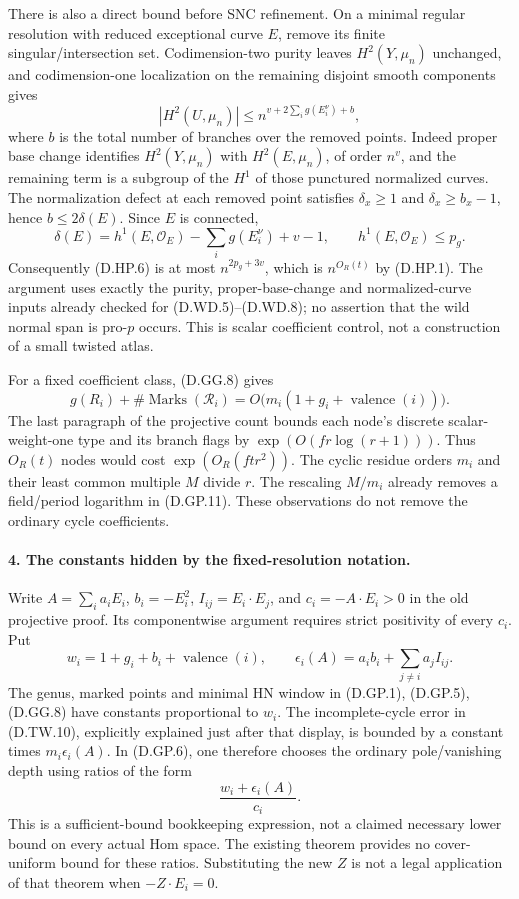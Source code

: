 There is also a direct bound before SNC refinement. On a minimal
regular resolution with reduced exceptional curve $E$, remove
its finite singular/intersection set. Codimension-two purity
leaves $H^2(Y,\mu_n)$ unchanged, and codimension-one localization
on the remaining disjoint smooth components gives
\[
 |H^2(U,\mu_n)|\le
 n^{v+2\sum_i g(E_i^\nu)+b},                             \tag{D.HP.6}
\]
where $b$ is the total number of branches over the removed
points. Indeed proper base change identifies $H^2(Y,\mu_n)$
with $H^2(E,\mu_n)$, of order $n^v$, and the remaining term
is a subgroup of the $H^1$ of those punctured normalized curves.
The normalization defect at each removed point satisfies
$\delta_x\ge1$ and $\delta_x\ge b_x-1$, hence
$b\le2\delta(E)$. Since $E$ is connected,
\[
 \delta(E)=h^1(E,\mathcal O_E)-\sum_i g(E_i^\nu)+v-1,
 \qquad h^1(E,\mathcal O_E)\le p_g.
\]
Consequently (D.HP.6) is at most $n^{2p_g+3v}$, which is
$n^{O_R(t)}$ by (D.HP.1). The argument uses exactly the purity,
proper-base-change and normalized-curve inputs already checked
for (D.WD.5)--(D.WD.8); no assertion that the wild normal span
is pro-$p$ occurs. This is scalar coefficient control, not a
construction of a small twisted atlas.

For a fixed coefficient class, (D.GG.8) gives
\[
 g(R_i)+\#\operatorname{Marks}(\mathcal R_i)
       =O\bigl(m_i(1+g_i+\operatorname{valence}(i))\bigr).
                                                               \tag{D.HP.7}
\]
The last paragraph of the projective count bounds each node's
discrete scalar-weight-one type and its branch flags by
$\exp(O(fr\log(r+1)))$. Thus $O_R(t)$ nodes would cost
$\exp(O_R(ftr^2))$. The cyclic residue orders $m_i$ and their
least common multiple $M$ divide $r$. The rescaling $M/m_i$
already removes a field/period logarithm in (D.GP.11).
These observations do not remove the ordinary cycle coefficients.

\paragraph{4. The constants hidden by the fixed-resolution notation.}
Write $A=\sum_i a_iE_i$, $b_i=-E_i^2$,
$I_{ij}=E_i\cdot E_j$, and $c_i=-A\cdot E_i>0$ in the old
projective proof. Its componentwise argument requires strict
positivity of every $c_i$. Put
\[
 w_i=1+g_i+b_i+\operatorname{valence}(i),\qquad
 \epsilon_i(A)=a_i b_i+\sum_{j\ne i}a_j I_{ij}.          \tag{D.HP.8}
\]
The genus, marked points and minimal HN window in (D.GP.1),
(D.GP.5), (D.GG.8) have constants proportional to $w_i$.
The incomplete-cycle error in (D.TW.10), explicitly explained
just after that display, is bounded by a constant times
$m_i\epsilon_i(A)$. In (D.GP.6), one therefore chooses the
ordinary pole/vanishing depth using ratios of the form
\[
              \frac{w_i+\epsilon_i(A)}{c_i}.             \tag{D.HP.9}
\]
This is a sufficient-bound bookkeeping expression, not a
claimed necessary lower bound on every actual Hom space.
The existing theorem provides no cover-uniform bound for these
ratios. Substituting the new $Z$ is not a legal application of
that theorem when $-Z\cdot E_i=0$.

